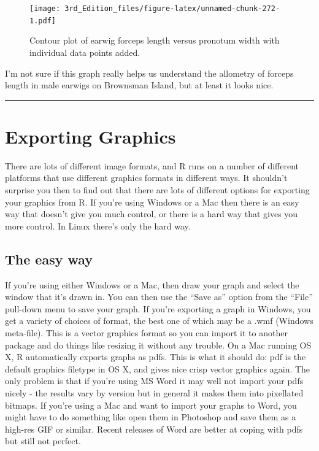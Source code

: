 \documentclass[
]{book}
\newenvironment{Shaded}{\begin{snugshade}}{\end{snugshade}}
\newcommand{\DataTypeTok}[1]{\textcolor[rgb]{0.13,0.29,0.53}{#1}}
\newcommand{\DecValTok}[1]{\textcolor[rgb]{0.00,0.00,0.81}{#1}}
\newcommand{\FloatTok}[1]{\textcolor[rgb]{0.00,0.00,0.81}{#1}}
\newcommand{\KeywordTok}[1]{\textcolor[rgb]{0.13,0.29,0.53}{\textbf{#1}}}
\newcommand{\NormalTok}[1]{#1}
\newcommand{\OperatorTok}[1]{\textcolor[rgb]{0.81,0.36,0.00}{\textbf{#1}}}
\begin{document}
\begin{Shaded}
\end{Shaded}

\begin{figure}
\centering
\texttt{[image: 3rd\_Edition\_files/figure-latex/unnamed-chunk-272-1.pdf]}
\caption{\label{fig:unnamed-chunk-272}Contour plot of earwig forceps length versus pronotum width with individual data points added.}
\end{figure}

I'm not sure if this graph really helps us understand the allometry of forceps length in male earwigs on Brownsman Island, but at least it looks nice.

\begin{center}\rule{0.5\linewidth}{0.5pt}\end{center}

\hypertarget{exporting-graphics}{%
\section{Exporting Graphics}\label{exporting-graphics}}

There are lots of different image formats, and R runs on a number of different platforms that use different graphics formats in different ways. It shouldn't surprise you then to find out that there are lots of different options for exporting your graphics from R. If you're using Windows or a Mac then there is an easy way that doesn't give you much control, or there is a hard way that gives you more control. In Linux there's only the hard way.

\hypertarget{the-easy-way}{%
\subsection{The easy way}\label{the-easy-way}}

If you're using either Windows or a Mac, then draw your graph and select the window that it's drawn in. You can then use the ``Save as'' option from the ``File'' pull-down menu to save your graph. If you're exporting a graph in Windows, you get a variety of choices of format, the best one of which may be a .wmf (Windows meta-file). This is a vector graphics format so you can import it to another package and do things like resizing it without any trouble. On a Mac running OS X, R automatically exports graphs as pdfs. This is what it should do: pdf is the default graphics filetype in OS X, and gives nice crisp vector graphics again. The only problem is that if you're using MS Word it may well not import your pdfs nicely - the results vary by version but in general it makes them into pixellated bitmaps. If you're using a Mac and want to import your graphs to Word, you might have to do something like open them in Photoshop and save them as a high-res GIF or similar. Recent releases of Word are better at coping with pdfs but still not perfect.
\end{document}
